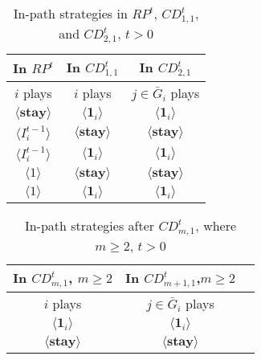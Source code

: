 \documentclass[12pt,letter]{article}
\theoremstyle{definition}
\theoremstyle{remark}
\theoremstyle{claim}
\begin{document}
\begin{table}[ht]
\caption{In-path strategies in $RP^t$, $CD^t_{1,1}$, and $CD^t_{2,1}$, $t>0$}
\label{Table_stg_cdt21}
\begin{center}
\begin{tabular}{c c c}
In $RP^t$ 	 	&  	In $CD^t_{1,1}$		&  In $CD^t_{2,1}$	\\
\hline
\hline
$i$ plays 		  							&  	$i$ plays									& $j\in \bar{G}_{i}$ plays  \\
\hline
$\langle  \textbf{stay} \rangle$ 	& 	$\langle \mathbf{1}_i \rangle$	    & $\langle \mathbf{1}_i \rangle$ \\
$\langle  {I^{t-1}_i} \rangle$ 		&  $\langle \textbf{stay} \rangle$		& $\langle \textbf{stay} \rangle$     \\
$\langle  {I^{t-1}_i} \rangle$ 		&  $\langle \mathbf{1}_i \rangle$		& $\langle \mathbf{1}_i \rangle$     \\
$\langle 1 \rangle$ 		             &  $\langle \textbf{stay} \rangle$		& $\langle \textbf{stay} \rangle$  \\
$\langle 1 \rangle$ 		             &  $\langle \mathbf{1}_i \rangle$		&  $\langle \mathbf{1}_i \rangle$  
\end{tabular}
\end{center}
\end{table}

\begin{table}[ht]
\caption{In-path strategies after $CD^t_{m,1}$, where $m\geq 2$, $t>0$}
\label{Table_stg_cdtm1}
\begin{center}
\begin{tabular}{c c c}
In $CD^t_{m,1}$, $m\geq 2$ 	 	&  	In $CD^t_{m+1,1}$,$m\geq 2$		& 	\\
\hline
\hline
$i$ plays 		  							&  $j\in \bar{G}_{i}$ plays  								& \\
\hline
$\langle \mathbf{1}_i \rangle$ 	& 	$\langle \mathbf{1}_i \rangle$	    &  \\
$\langle \textbf{stay} \rangle$		&  $\langle \textbf{stay} \rangle$	&  \\

\end{tabular}
\end{center}
\end{table}
\end{document}
